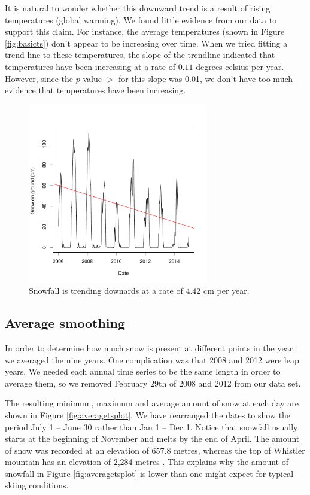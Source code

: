 \documentclass[12pt,twoside]{article}
\begin{document}
{It is natural to wonder whether this downward trend is a result of rising temperatures (global warming). We found little evidence from our data to support this claim. For instance, the average temperatures (shown in Figure \ref{fig:basicts}) don't appear to be increasing  over time. When we tried fitting a trend line to these temperatures, the slope of the trendline indicated that temperatures have been increasing at a rate of $0.11$ degrees celsius per year. However, since the $p$-value $>$ for this slope was 0.01, we don't have too much evidence that temperatures have been increasing.


\begin{figure}[!ht]
\begin{center}
\includegraphics[width=0.7\textwidth]{report-snowtrend}
\end{center}
\vspace{-5mm}
\caption{Snowfall is trending downards at a rate of 4.42 cm per year.}
\label{fig:snowtrend}
\end{figure}

\subsection{Average smoothing}

In order to determine how much snow is present at different points in the year, we averaged the nine years. One complication was that 2008 and 2012 were leap years. We needed each annual time series to be the same length in order to average them, so we removed February 29th of 2008 and 2012 from our data set.

The resulting minimum, maximum and average amount of snow at each day are shown in Figure \ref{fig:averagetsplot}. We have rearranged the dates to show the period July 1 -- June 30 rather than Jan 1 -- Dec 1. Notice that snowfall usually starts at the beginning of November and melts by the end of April. The amount of snow was recorded at an elevation of 657.8 metres, whereas the top of Whistler mountain has an elevation of 2,284 metres \cite{WhistlerBlackcomb}. This explains why the amount of snowfall in Figure \ref{fig:averagetsplot} is lower than one might expect for typical skiing conditions.

}
\end{document}
